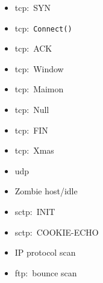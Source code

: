 \documentclass[titlepage]{article}
\begin{document}
\begin{itemize}
  \item{\gls{tcp}:\ SYN}
  \item{\gls{tcp}:\ \verb|Connect()|}
  \item{\gls{tcp}:\ ACK}
  \item{\gls{tcp}:\ Window}
  \item{\gls{tcp}:\ Maimon}
  \item{\gls{tcp}:\ Null}
  \item{\gls{tcp}:\ FIN}
  \item{\gls{tcp}:\ Xmas}
  \item{\gls{udp}}
  \item{Zombie host/idle}
  \item{\gls{sctp}:\ INIT}
  \item{\gls{sctp}:\ COOKIE-ECHO}
  \item{IP protocol scan}
  \item{\gls{ftp}:\ bounce scan}
\end{itemize}
\end{document}
